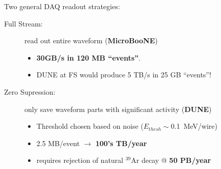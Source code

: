 \begin{frame}
  \footnotesize
  Two general DAQ readout strategies:
  \begin{description}
  \item[Full Stream:] read out entire waveform (\textbf{MicroBooNE})
    \begin{itemize}
    \item \textbf{30GB/s in 120 MB ``events''}.
    \item DUNE at FS would produce 5 TB/s in 25 GB ``events''!
    \end{itemize}
  \item[Zero Supression:] only save waveform parts with significant activity (\textbf{DUNE})
    \begin{itemize}
    \item Threshold chosen based on noise ($E_{thesh} \sim$\SI{0.1}{\mega\electronvolt}/wire)
    \item 2.5 MB/event $\rightarrow$ \textbf{100's TB/year}
    \item requires rejection of natural $^{39}$Ar decay @ \textbf{50 PB/year}
    \end{itemize}
  \end{description}

\end{frame}

